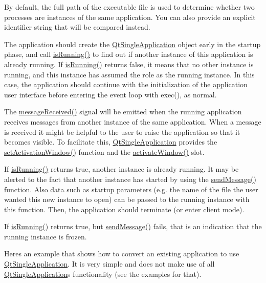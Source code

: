 By default, the full path of the executable file is used to determine whether two processes are instances of the same application. You can also provide an explicit identifier string that will be compared instead.

The application should create the \hyperlink{class_qt_single_application}{Qt\+Single\+Application} object early in the startup phase, and call \hyperlink{class_qt_single_application_aa9f0e6e4f18ac79bbb7a955cd860894d}{is\+Running()} to find out if another instance of this application is already running. If \hyperlink{class_qt_single_application_aa9f0e6e4f18ac79bbb7a955cd860894d}{is\+Running()} returns false, it means that no other instance is running, and this instance has assumed the role as the running instance. In this case, the application should continue with the initialization of the application user interface before entering the event loop with exec(), as normal.

The \hyperlink{class_qt_single_application_a69340cef3d26d026e11424930e5a5866}{message\+Received()} signal will be emitted when the running application receives messages from another instance of the same application. When a message is received it might be helpful to the user to raise the application so that it becomes visible. To facilitate this, \hyperlink{class_qt_single_application}{Qt\+Single\+Application} provides the \hyperlink{class_qt_single_application_acb5347f6dc6822dbe4d6a78804043528}{set\+Activation\+Window()} function and the \hyperlink{class_qt_single_application_a0881b32c76132b499f3180064006abc1}{activate\+Window()} slot.

If \hyperlink{class_qt_single_application_aa9f0e6e4f18ac79bbb7a955cd860894d}{is\+Running()} returns true, another instance is already running. It may be alerted to the fact that another instance has started by using the \hyperlink{class_qt_single_application_a0e2f3900f0290913c738ec6b4b959922}{send\+Message()} function. Also data such as startup parameters (e.\+g. the name of the file the user wanted this new instance to open) can be passed to the running instance with this function. Then, the application should terminate (or enter client mode).

If \hyperlink{class_qt_single_application_aa9f0e6e4f18ac79bbb7a955cd860894d}{is\+Running()} returns true, but \hyperlink{class_qt_single_application_a0e2f3900f0290913c738ec6b4b959922}{send\+Message()} fails, that is an indication that the running instance is frozen.

Here\textquotesingle{}s an example that shows how to convert an existing application to use \hyperlink{class_qt_single_application}{Qt\+Single\+Application}. It is very simple and does not make use of all \hyperlink{class_qt_single_application}{Qt\+Single\+Application}\textquotesingle{}s functionality (see the examples for that).


